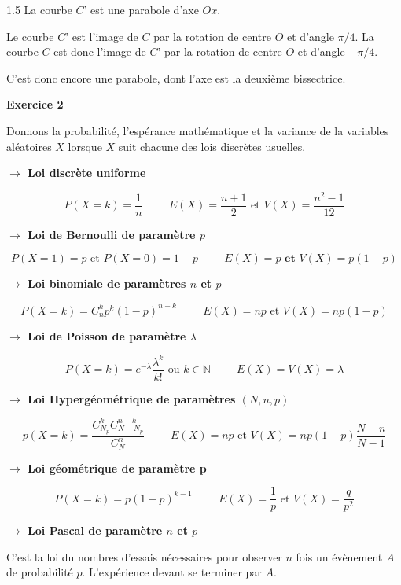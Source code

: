 \documentclass[12pt]{article}
\begin{document}
\begin{spacing}{1.5}
La courbe $C’$ est une parabole d'axe $Ox$.
 
Le courbe $C’$ est l'image de $C$ par la rotation de centre $O$ et d'angle $\pi/4$. La courbe $C$ est 
donc l'image de $C’$ par la rotation de centre $O$ et d'angle $- \pi/4$. 

C'est donc encore une parabole, dont l'axe est la deuxième bissectrice.

\medskip\textbf{Exercice 2}

Donnons la probabilité, l'espérance mathématique et la variance de la variables aléatoires $X$ lorsque $X$ suit chacune des lois discrètes usuelles.

\textbf{$\rightarrow$ Loi discrète uniforme}

\[P(X=k)=\frac{1}{n} \hspace{1cm} E(X)=\frac{n+1}{2} \text{ et } V(X)=\frac{n^2-1}{12}\]

\medskip\textbf{$\rightarrow$ Loi de Bernoulli de paramètre $p$}

\[P(X=1)=p \text{ et } P(X=0)=1-p \hspace{1cm}  E(X)=p \textbf{ et } V(X)=p(1-p)\]

\medskip\textbf{$\rightarrow$ Loi binomiale de paramètres $n$ et $p$}

\[P(X=k)=C_n^kp^k(1-p)^{n-k} \hspace{1cm} E(X)=np \text{ et } V(X)=np(1-p)\]

\medskip\textbf{$\rightarrow$ Loi de Poisson de paramètre $\lambda$}

\[P(X=k)=e^{-\lambda}\frac{\lambda^k}{k!} \text{ ou } k\in \mathbb{N} \hspace{1cm} E(X)=V(X)=\lambda\]

\medskip\textbf{$\rightarrow$ Loi Hypergéométrique de paramètres $(N,n,p)$}

\[p(X=k)=\frac{C_{N_p}^kC_{N-N_p}^{n-k}}{C_N^n} \hspace{1cm} E(X)=np \text{ et } V(X)=np(1-p)\frac{N-n}{N-1}\]

\medskip\textbf{$\rightarrow$ Loi géométrique de paramètre p}

\[P(X=k)=p(1-p)^{k-1} \hspace{1cm} E(X)=\frac{1}{p} \text{ et } V(X)=\frac{q}{p^2}\]

\medskip\textbf{$\rightarrow$ Loi Pascal de paramètre $n$ et $p$}

C'est la loi du nombres d'essais nécessaires pour observer $n$ fois un évènement $A$ de probabilité $p$. L'expérience devant se terminer par $A$.


\end{spacing}
\end{document}
